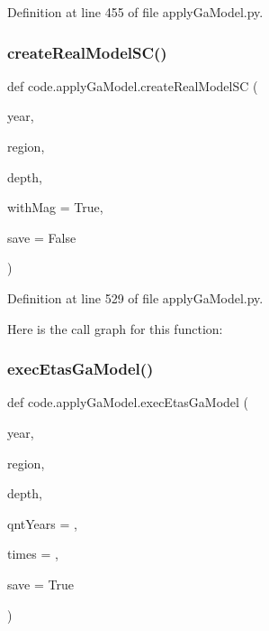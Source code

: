 Definition at line 455 of file apply\+Ga\+Model.\+py.

\mbox{\label{namespacecode_1_1apply_ga_model_a01ab17f5193cbafa683032106b0f32d7}} 
\subsubsection{\texorpdfstring{create\+Real\+Model\+S\+C()}{createRealModelSC()}}
{\footnotesize\ttfamily def code.\+apply\+Ga\+Model.\+create\+Real\+Model\+SC (\begin{DoxyParamCaption}\item[{}]{year,  }\item[{}]{region,  }\item[{}]{depth,  }\item[{}]{with\+Mag = {\ttfamily True},  }\item[{}]{save = {\ttfamily False} }\end{DoxyParamCaption})}



Definition at line 529 of file apply\+Ga\+Model.\+py.

Here is the call graph for this function\+:
\mbox{\label{namespacecode_1_1apply_ga_model_a8c8aeb9d71e52b5801385c7d463a5c9c}} 
\subsubsection{\texorpdfstring{exec\+Etas\+Ga\+Model()}{execEtasGaModel()}}
{\footnotesize\ttfamily def code.\+apply\+Ga\+Model.\+exec\+Etas\+Ga\+Model (\begin{DoxyParamCaption}\item[{}]{year,  }\item[{}]{region,  }\item[{}]{depth,  }\item[{}]{qnt\+Years = {},  }\item[{}]{times = {},  }\item[{}]{save = {\ttfamily True} }\end{DoxyParamCaption})}



